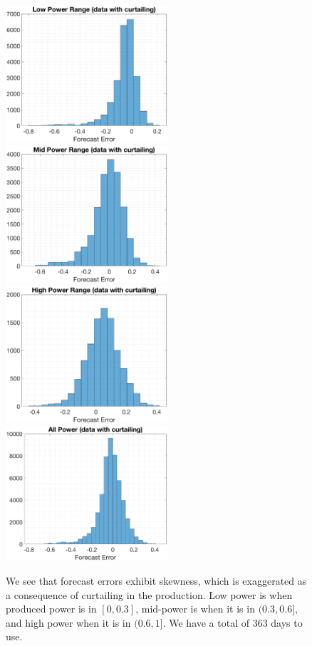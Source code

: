 \documentclass[11pt]{article}
\begin{document}
\begin{figure}
  \includegraphics[width=60mm,scale=1]{plots/LP_6.eps}
  \includegraphics[width=60mm,scale=1]{plots/MP_6.eps}\\
   \includegraphics[width=60mm,scale=1]{plots/HP_6.eps}
  \includegraphics[width=60mm,scale=1]{plots/AP_6.eps}
  \caption{We see that forecast errors exhibit skewness, which is exaggerated as a consequence of curtailing in the production. Low power is when produced power is in $[0,0.3]$, mid-power is when it is in $(0.3,0.6]$, and high power when it is in $(0.6,1]$. We have a total of 363 days to use.}
  \label{fig:data_curtailing}
\end{figure}
\end{document}
